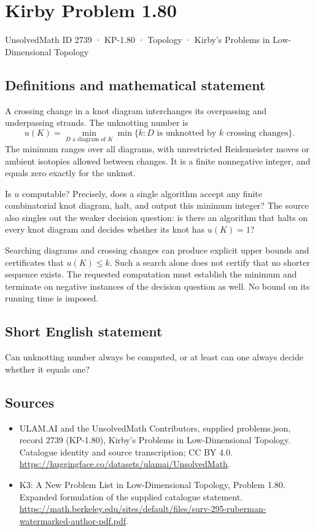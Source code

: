 \documentclass[11pt,a4paper]{article}
\begin{document}
\section*{Kirby Problem 1.80}\label{2739}
{\small UnsolvedMath ID 2739 · KP-1.80 · Topology · Kirby's Problems in Low-Dimensional Topology}
\subsection{Definitions and mathematical statement}
A crossing change in a knot diagram interchanges its overpassing and
underpassing strands. The unknotting number is
\[
u(K)=\min_{D\text{ a diagram of }K}
\min\{k:D\text{ is unknotted by }k\text{ crossing changes}\}.
\]
The minimum ranges over all diagrams, with unrestricted Reidemeister moves or
ambient isotopies allowed between changes. It is a finite nonnegative integer,
and equals zero exactly for the unknot.

Is $u$ computable? Precisely, does a single algorithm accept any finite
combinatorial knot diagram, halt, and output this minimum integer? The source
also singles out the weaker decision question: is there an algorithm that halts
on every knot diagram and decides whether its knot has $u(K)=1$?

Searching diagrams and crossing changes can produce explicit upper bounds and
certificates that $u(K)\leq k$. Such a search alone does not certify that no
shorter sequence exists. The requested computation must establish the minimum
and terminate on negative instances of the decision question as well. No bound
on its running time is imposed.
\subsection{Short English statement}
Can unknotting number always be computed, or at least can one always decide whether it equals one?
\subsection{Sources}
\begin{itemize}
\item[S1] ULAM.AI and the UnsolvedMath Contributors, supplied problems.json, record 2739 (KP-1.80), Kirby's Problems in Low-Dimensional Topology. Catalogue identity and source transcription; CC BY 4.0.
\url{https://huggingface.co/datasets/ulamai/UnsolvedMath}.
\item[S2] K3: A New Problem List in Low-Dimensional Topology, Problem 1.80. Expanded formulation of the supplied catalogue statement.
\url{https://math.berkeley.edu/sites/default/files/surv-295-ruberman-watermarked-author-pdf.pdf}.
\end{itemize}
\end{document}
